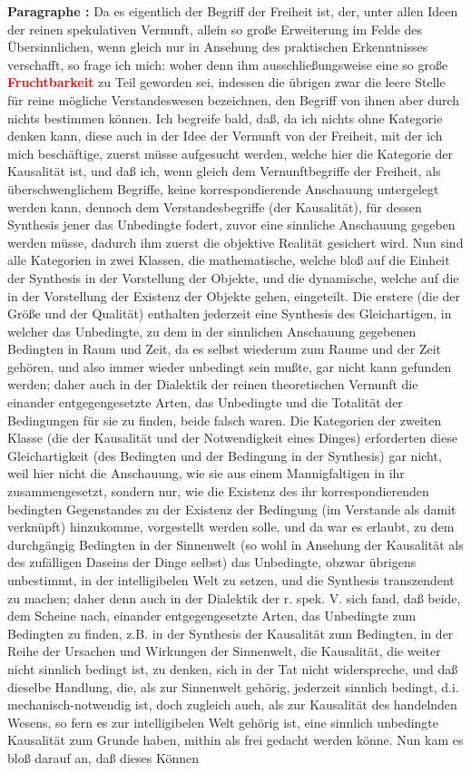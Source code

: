 \documentclass[a4paper,12pt,twoside]{book}
\newcommand{\match}[1]{\textcolor{red}{\textbf{#1}}}
\begin{document}
	\noindent\textbf{Paragraphe : }Da es eigentlich der Begriff der Freiheit ist, der, unter allen Ideen der reinen spekulativen Vernunft, allein so große Erweiterung im Felde des Übersinnlichen, wenn gleich nur in Ansehung des praktischen Erkenntnisses verschafft, so frage ich mich: woher denn ihm ausschließungsweise eine so große \match{Fruchtbarkeit} zu Teil geworden sei, indessen die übrigen zwar die leere Stelle für reine mögliche Verstandeswesen bezeichnen, den Begriff von ihnen aber durch nichts bestimmen können. Ich begreife bald, daß, da ich nichts ohne Kategorie denken kann, diese auch in der Idee der Vernunft von der Freiheit, mit der ich mich beschäftige, zuerst müsse aufgesucht werden, welche hier die Kategorie der Kausalität ist, und daß ich, wenn gleich dem Vernunftbegriffe der Freiheit, als überschwenglichem Begriffe, keine korrespondierende Anschauung untergelegt werden kann, dennoch dem Verstandesbegriffe (der Kausalität), für dessen Synthesis jener das Unbedingte fodert, zuvor eine sinnliche Anschauung gegeben werden müsse, dadurch ihm zuerst die objektive Realität gesichert wird. Nun sind alle Kategorien in zwei Klassen, die mathematische, welche bloß auf die Einheit der Synthesis in der Vorstellung der Objekte, und die dynamische, welche auf die in der Vorstellung der Existenz der Objekte gehen, eingeteilt. Die erstere (die der Größe und der Qualität) enthalten jederzeit eine Synthesis des Gleichartigen, in welcher das Unbedingte, zu dem in der sinnlichen Anschauung gegebenen Bedingten in Raum und Zeit, da es selbst wiederum zum Raume und der Zeit gehören, und also  immer wieder unbedingt sein mußte, gar nicht kann gefunden werden; daher auch in der Dialektik der reinen theoretischen Vernunft die einander entgegengesetzte Arten, das Unbedingte und die Totalität der Bedingungen für sie zu finden, beide falsch waren. Die Kategorien der zweiten Klasse (die der Kausalität und der Notwendigkeit eines Dinges) erforderten diese Gleichartigkeit (des Bedingten und der Bedingung in der Synthesis) gar nicht, weil hier nicht die Anschauung, wie sie aus einem Mannigfaltigen in ihr zusammengesetzt, sondern nur, wie die Existenz des ihr korrespondierenden bedingten Gegenstandes zu der Existenz der Bedingung (im Verstande als damit verknüpft) hinzukomme, vorgestellt werden solle, und da war es erlaubt, zu dem durchgängig Bedingten in der Sinnenwelt (so wohl in Ansehung der Kausalität als des zufälligen Daseins der Dinge selbst) das Unbedingte, obzwar übrigens unbestimmt, in der intelligibelen Welt zu setzen, und die Synthesis transzendent zu machen; daher denn auch in der Dialektik der r. spek. V. sich fand, daß beide, dem Scheine nach, einander entgegengesetzte Arten, das Unbedingte zum Bedingten zu finden, z.B. in der Synthesis der Kausalität zum Bedingten, in der Reihe der Ursachen und Wirkungen der Sinnenwelt, die Kausalität, die weiter nicht sinnlich bedingt ist, zu denken, sich in der Tat nicht widerspreche, und daß dieselbe Handlung, die, als zur Sinnenwelt gehörig, jederzeit sinnlich bedingt, d.i. mechanisch-notwendig ist, doch zugleich auch, als zur Kausalität des handelnden Wesens, so fern es zur intelligibelen Welt gehörig ist, eine sinnlich unbedingte Kausalität zum Grunde haben, mithin als frei gedacht werden könne. Nun kam es bloß darauf an, daß dieses Können 
\end{document}
